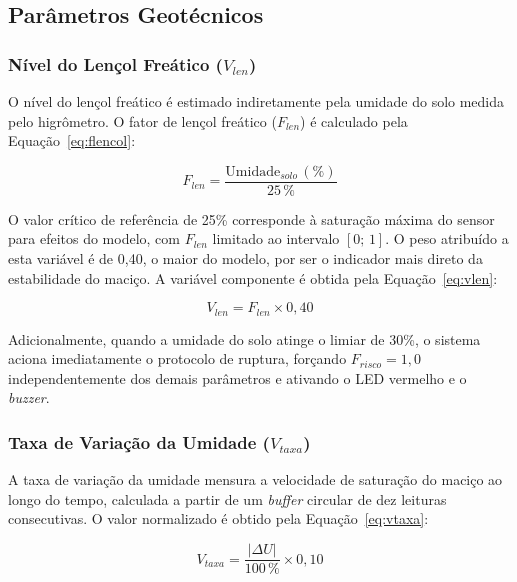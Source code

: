 \subsection{Parâmetros Geotécnicos}
\label{subsec:geotecnicos}

\subsubsection{Nível do Lençol Freático (\texorpdfstring{$V_{len}$}{V\_len})}

O nível do lençol freático é estimado indiretamente pela umidade do
solo medida pelo higrômetro. O fator de lençol freático
($F_{len}$) é calculado pela Equação~\ref{eq:flencol}:

\begin{equation}
\label{eq:flencol}
F_{len} = \frac{\text{Umidade}_{solo}\,(\%)}{25\,\%}
\end{equation}

O valor crítico de referência de 25\% corresponde à saturação máxima
do sensor para efeitos do modelo, com $F_{len}$ limitado ao intervalo
$[0;\,1]$. O peso atribuído a esta variável é de 0,40, o maior do
modelo, por ser o indicador mais direto da estabilidade do maciço.
A variável componente é obtida pela Equação~\ref{eq:vlen}:

\begin{equation}
\label{eq:vlen}
V_{len} = F_{len} \times 0{,}40
\end{equation}

Adicionalmente, quando a umidade do solo atinge o limiar de 30\%,
o sistema aciona imediatamente o protocolo de ruptura, forçando
$F_{risco} = 1{,}0$ independentemente dos demais parâmetros e
ativando o LED vermelho e o \textit{buzzer}.

\subsubsection{Taxa de Variação da Umidade (\texorpdfstring{$V_{taxa}$}{V\_taxa})}

A taxa de variação da umidade mensura a velocidade de saturação do
maciço ao longo do tempo, calculada a partir de um \textit{buffer}
circular de dez leituras consecutivas. O valor normalizado é obtido
pela Equação~\ref{eq:vtaxa}:

\begin{equation}
\label{eq:vtaxa}
V_{taxa} = \frac{|\Delta U|}{100\,\%} \times 0{,}10
\end{equation}

